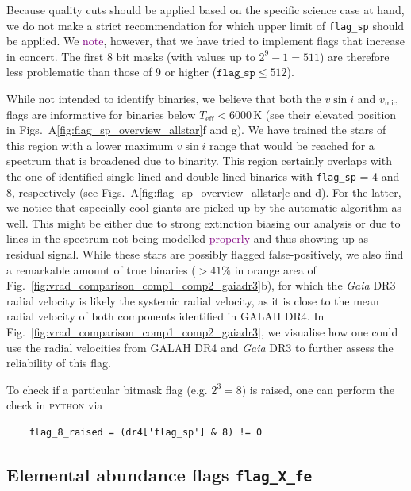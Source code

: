 \documentclass[
  journal=pasa,
  manuscript=research-paper, %
  year=2024,
  volume=37
]{cup-journal}
\newcommand{\adjusted}[1]{{\textcolor{purple}{#1}}}
\newcommand{\vmic}{$v_\mathrm{mic}$\xspace}
\newcommand{\vsini}{$v \sin i$\xspace}
\newcommand{\Gaia}{\textit{Gaia}\xspace}
\begin{document}
Because quality cuts should be applied based on the specific science case at hand, we do not make a strict recommendation for which upper limit of \texttt{flag\_sp} should be applied. We \adjusted{note}, however, that we have tried to implement flags that increase in concert. The first 8 bit masks (with values up to $2^9-1 = 511$) are therefore less problematic than those of 9  or higher ($\texttt{flag\_sp} \leq 512$).



While not intended to identify binaries, we believe that both the \vsini and \vmic flags are informative for binaries below $T_\mathrm{eff} < 6000\,\mathrm{K}$ (see their elevated position in Figs.~A\ref{fig:flag_sp_overview_allstar}f and g). We have trained the stars of this region with a lower maximum \vsini range that would be reached for a spectrum that is broadened due to binarity. This region certainly overlaps with the one of identified single-lined and double-lined binaries with \texttt{flag\_sp} = 4 and 8, respectively (see Figs.~A\ref{fig:flag_sp_overview_allstar}c and d). For the latter, we notice that especially cool giants are picked up by the automatic algorithm as well. This might be either due to strong extinction biasing our analysis or due to lines in the spectrum not being modelled \adjusted{properly} and thus showing up as residual signal. While these stars are possibly flagged false-positively, we also find a remarkable amount of true binaries ($>41\%$ in orange area of Fig.~\ref{fig:vrad_comparison_comp1_comp2_gaiadr3}b), for which the \Gaia DR3 radial velocity is likely the systemic radial velocity, as it is close to the mean radial velocity of both components identified in GALAH DR4. In Fig.~\ref{fig:vrad_comparison_comp1_comp2_gaiadr3}, we visualise how one could use the radial velocities from GALAH DR4 and \Gaia DR3 to further assess the reliability of this flag.


To check if a particular bitmask flag (e.g. $2^3 = 8$) is raised, one can perform the check in \textsc{python} via
\begin{verbatim}
    flag_8_raised = (dr4['flag_sp'] & 8) != 0
\end{verbatim}

\subsection{Elemental abundance flags \texttt{flag\_X\_fe}}
\label{sec:flag_x_fe}
\end{document}

